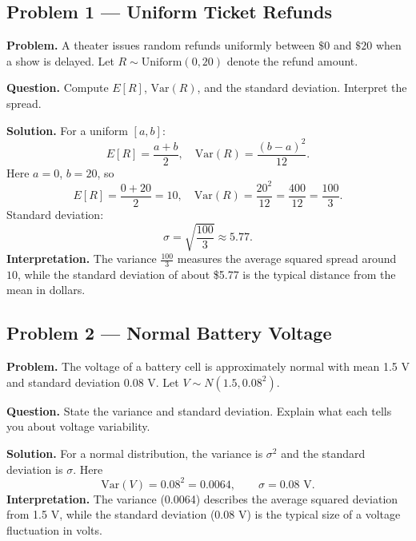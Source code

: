	\begin{ExamProblems}
		
		\hypertarget{c4-ex1}{}
		\item
		\subsection*{Problem 1 — Uniform Ticket Refunds}
		
		\textbf{Problem.}
		A theater issues random refunds uniformly between \(\$0\) and \(\$20\) when a show is delayed.
		Let \(R\sim\text{Uniform}(0,20)\) denote the refund amount.
		
		\textbf{Question.} Compute \(E[R]\), \(\mathrm{Var}(R)\), and the standard deviation. Interpret the spread.
		
		\textbf{Solution.}
		For a uniform \([a,b]\):
		\[
		E[R]=\frac{a+b}{2},\quad \mathrm{Var}(R)=\frac{(b-a)^2}{12}.
		\]
		Here \(a=0\), \(b=20\), so
		\[
		E[R]=\frac{0+20}{2}=10,\quad \mathrm{Var}(R)=\frac{20^2}{12}=\frac{400}{12}=\frac{100}{3}.
		\]
		Standard deviation:
		\[
		\sigma=\sqrt{\frac{100}{3}}\approx 5.77.
		\]
		\textbf{Interpretation.} The variance \(\frac{100}{3}\) measures the average squared spread around \(10\),
		while the standard deviation of about \$5.77 is the typical distance from the mean in dollars.
		
		
		\hypertarget{c4-ex2}{}
		\item
		\subsection*{Problem 2 — Normal Battery Voltage}
		
		\textbf{Problem.}
		The voltage of a battery cell is approximately normal with mean 1.5 V and standard deviation 0.08 V.
		Let \(V\sim N(1.5,0.08^2)\).
		
		\textbf{Question.} State the variance and standard deviation. Explain what each tells you
		about voltage variability.
		
		\textbf{Solution.}
		For a normal distribution, the variance is \(\sigma^2\) and the standard deviation is \(\sigma\).
		Here
		\[
		\mathrm{Var}(V)=0.08^2=0.0064,\qquad \sigma=0.08\text{ V}.
		\]
		\textbf{Interpretation.} The variance (0.0064) describes the average squared deviation from 1.5 V,
		while the standard deviation (0.08 V) is the typical size of a voltage fluctuation in volts.
		

\end{ExamProblems}
